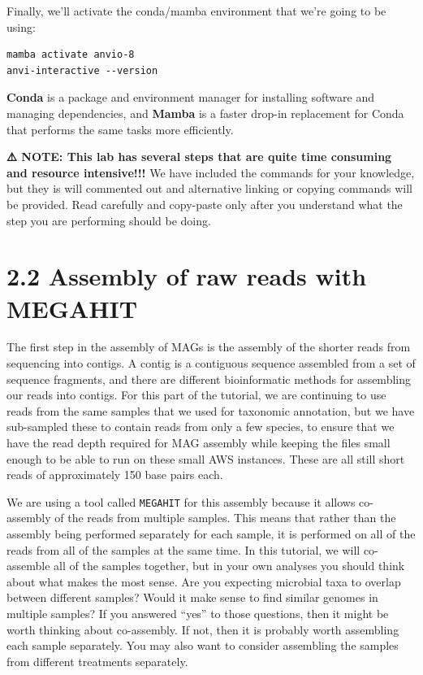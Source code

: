 \documentclass[
]{book}
\begin{document}
Finally, we'll activate the conda/mamba environment that we're going to be using:

\begin{verbatim}
mamba activate anvio-8
anvi-interactive --version
\end{verbatim}

\textbf{Conda} is a package and environment manager for installing software and managing dependencies, and \textbf{Mamba} is a faster drop-in replacement for Conda that performs the same tasks more efficiently.

\textbf{⚠️ NOTE: This lab has several steps that are quite time consuming and resource intensive!!!}
We have included the commands for your knowledge, but they is will commented out and alternative linking or copying commands will be provided. Read carefully and copy-paste only after you understand what the step you are performing should be doing.

\section{2.2 Assembly of raw reads with MEGAHIT}\label{assembly-of-raw-reads-with-megahit}

The first step in the assembly of MAGs is the assembly of the shorter reads from sequencing into contigs. A contig is a contiguous sequence assembled from a set of sequence fragments, and there are different bioinformatic methods for assembling our reads into contigs. For this part of the tutorial, we are continuing to use reads from the same samples that we used for taxonomic annotation, but we have sub-sampled these to contain reads from only a few species, to ensure that we have the read depth required for MAG assembly while keeping the files small enough to be able to run on these small AWS instances. These are all still short reads of approximately 150 base pairs each.

We are using a tool called \texttt{MEGAHIT} for this assembly because it allows co-assembly of the reads from multiple samples. This means that rather than the assembly being performed separately for each sample, it is performed on all of the reads from all of the samples at the same time. In this tutorial, we will co-assemble all of the samples together, but in your own analyses you should think about what makes the most sense. Are you expecting microbial taxa to overlap between different samples? Would it make sense to find similar genomes in multiple samples? If you answered ``yes'' to those questions, then it might be worth thinking about co-assembly. If not, then it is probably worth assembling each sample separately. You may also want to consider assembling the samples from different treatments separately.
\end{document}
